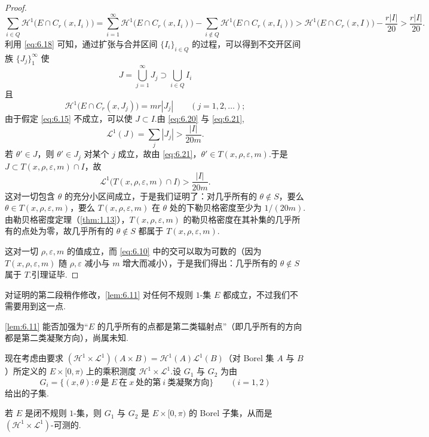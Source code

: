 \begin{proof}
\begin{equation}
  \sum_{i\in Q}\mathcal{H}^{1}\bigl(E\cap C_r(x,I_i)\bigr)
  =\sum_{i=1}^{\infty}\mathcal{H}^{1}\bigl(E\cap C_r(x,I_i)\bigr)
  -\sum_{i\notin Q}\mathcal{H}^{1}\bigl(E\cap C_r(x,I_i)\bigr)
  >\mathcal{H}^{1}\bigl(E\cap C_r(x,I)\bigr)-\frac{r|I|}{20}
  >\frac{r|I|}{20}.
\end{equation}
利用 \eqref{eq:6.18} 可知，通过扩张与合并区间 $\{I_i\}_{i\in Q}$ 的过程，可以得到不交开区间族 $\{J_j\}_{1}^{\infty}$ 使
\[
  J=\bigcup_{j=1}^{\infty}J_j\supset\bigcup_{i\in Q}I_i
\]
且
\begin{equation}\label{eq:6.21}
  \mathcal{H}^{1}\bigl(E\cap C_r(x,J_j)\bigr)=mr|J_j|\qquad(j=1,2,\ldots);
\end{equation}
由于假定 \eqref{eq:6.15} 不成立，可以使 $J\subset I$.由 \eqref{eq:6.20} 与 \eqref{eq:6.21},
\[
  \mathscr{L}^{1}(J)=\sum_{j}|J_j|>\frac{|I|}{20m}.
\]
若 $\theta'\in J$，则 $\theta'\in J_j$ 对某个 $j$ 成立，故由 \eqref{eq:6.21}，$\theta'\in T(x,\rho,\varepsilon,m)$.于是 $J\subset T(x,\rho,\varepsilon,m)\cap I$，故
\[
  \mathscr{L}^{1}\bigl(T(x,\rho,\varepsilon,m)\cap I\bigr)>\frac{|I|}{20m}.
\]
这对一切包含 $\theta$ 的充分小区间成立，于是我们证明了：对几乎所有的 $\theta\notin S$，要么 $\theta\in T(x,\rho,\varepsilon,m)$，要么 $T(x,\rho,\varepsilon,m)$ 在 $\theta$ 处的下勒贝格密度至少为 $1/(20m)$.由勒贝格密度定理（\cref{thm:1.13}），$T(x,\rho,\varepsilon,m)$ 的勒贝格密度在其补集的几乎所有的点处为零，故几乎所有的 $\theta\notin S$ 都属于 $T(x,\rho,\varepsilon,m)$.

这对一切 $\rho,\varepsilon,m$ 的值成立，而 \eqref{eq:6.10} 中的交可以取为可数的（因为 $T(x,\rho,\varepsilon,m)$ 随 $\rho,\varepsilon$ 减小与 $m$ 增大而减小），于是我们得出：几乎所有的 $\theta\notin S$ 属于 $T$.引理证毕.
\end{proof}

对证明的第二段稍作修改，\cref{lem:6.11} 对任何不规则 $1$-集 $E$ 都成立，不过我们不需要用到这一点.

\cref{lem:6.11} 能否加强为``$E$ 的几乎所有的点都是第二类辐射点''（即几乎所有的方向都是第二类凝聚方向），尚属未知.

现在考虑由要求 $(\mathcal{H}^1\times\mathscr{L}^1)(A\times B)=\mathcal{H}^1(A)\mathscr{L}^1(B)$（对 Borel 集 $A$ 与 $B$）所定义的 $E\times[0,\pi)$ 上的乘积测度 $\mathcal{H}^1\times\mathscr{L}^1$.设 $G_1$ 与 $G_2$ 为由
\[
  G_i=\{(x,\theta):\theta\ \text{是}\ E\ \text{在}\ x\ \text{处的第}\ i\ \text{类凝聚方向}\}\qquad(i=1,2)
\]
给出的子集.

\begin{lemma}\label{lem:6.12}
若 $E$ 是闭不规则 $1$-集，则 $G_1$ 与 $G_2$ 是 $E\times[0,\pi)$ 的 Borel 子集，从而是 $(\mathcal{H}^1\times\mathscr{L}^1)$-可测的.
\end{lemma}

